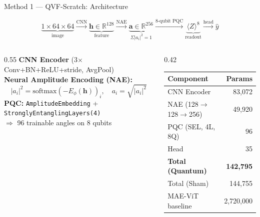 \documentclass[aspectratio=169]{beamer}
\begin{document}
\begin{frame}{Method 1 — QVF-Scratch: Architecture}

\[
\underbrace{1{\times}64{\times}64}_{\text{image}}
\xrightarrow{\text{CNN}}
\underbrace{\mathbf{h}\in\mathbb{R}^{128}}_{\text{feature}}
\xrightarrow{\text{NAE}}
\underbrace{\mathbf{a}\in\mathbb{R}^{256}}_{\Sigma|a_i|^2=1}
\xrightarrow{\text{8-qubit PQC}}
\underbrace{\langle Z\rangle^8}_{\text{readout}}
\xrightarrow{\text{head}}
\hat{y}
\]

\medskip
\begin{columns}
\begin{column}{0.55\textwidth}
\textbf{CNN Encoder} (3$\times$ Conv+BN+ReLU+stride, AvgPool)\\[4pt]
\textbf{Neural Amplitude Encoding (NAE):}
\[|a_i|^2 = \text{softmax}(-E_\phi(\mathbf{h}))_i,\quad a_i=\sqrt{|a_i|^2}\]
\textbf{PQC:} \texttt{AmplitudeEmbedding} + \texttt{StronglyEntanglingLayers(4)}\\
\quad $\Rightarrow$ 96 trainable angles on 8 qubits
\end{column}
\begin{column}{0.42\textwidth}
\small
\begin{tabular}{@{}lr@{}}
\toprule
Component & Params \\
\midrule
CNN Encoder & 83,072 \\
NAE (128$\to$128$\to$256) & 49,920 \\
PQC (SEL, 4L, 8Q) & 96 \\
Head & 35 \\
\midrule
\textbf{Total (Quantum)} & \textbf{142,795} \\
Total (Sham) & 144,755 \\
MAE-ViT baseline & 2,720,000 \\
\bottomrule
\end{tabular}
\end{column}
\end{columns}
\end{frame}
\end{document}
